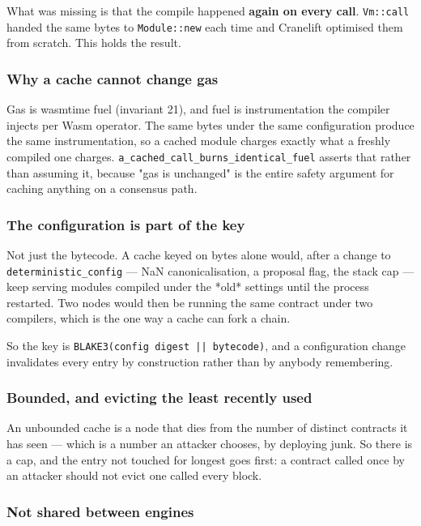 \documentclass[11pt,a4paper]{article}
\begin{document}
What was missing is that the compile happened \textbf{again on every call}.
\texttt{Vm::call} handed the same bytes to \texttt{Module::new} each time and Cranelift
optimised them from scratch. This holds the result.

\subsubsection{Why a cache cannot change gas}

Gas is wasmtime fuel (invariant 21), and fuel is instrumentation the compiler
injects per Wasm operator. The same bytes under the same configuration
produce the same instrumentation, so a cached module charges exactly what a
freshly compiled one charges. \texttt{a\_cached\_call\_burns\_identical\_fuel} asserts
that rather than assuming it, because "gas is unchanged" is the entire safety
argument for caching anything on a consensus path.

\subsubsection{The configuration is part of the key}

Not just the bytecode. A cache keyed on bytes alone would, after a change to
\texttt{deterministic\_config} — NaN canonicalisation, a proposal flag, the stack cap
— keep serving modules compiled under the *old* settings until the process
restarted. Two nodes would then be running the same contract under two
compilers, which is the one way a cache can fork a chain.

So the key is \texttt{BLAKE3(config digest || bytecode)}, and a configuration change
invalidates every entry by construction rather than by anybody remembering.

\subsubsection{Bounded, and evicting the least recently used}

An unbounded cache is a node that dies from the number of distinct contracts
it has seen — which is a number an attacker chooses, by deploying junk. So
there is a cap, and the entry not touched for longest goes first: a contract
called once by an attacker should not evict one called every block.

\subsubsection{Not shared between engines}
\end{document}
